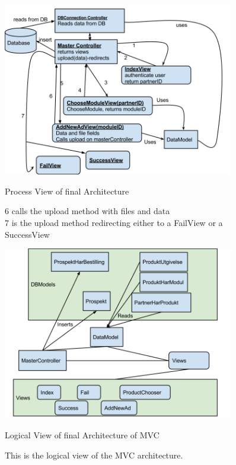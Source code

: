 \begin{center}
\begin{figure}[H]
\centering
\includegraphics[width=0.9\textwidth]{images/architecture_final01.png}
\caption{Process View of final Architecture}
\caption*{6 calls the upload method with files and data\\
7 is the upload method redirecting either to a FailView or a SuccessView}
\label{fig:process_view}
\end{figure}
\end{center}

\begin{center}
\begin{figure}[H]
\centering
\includegraphics[width=0.9\textwidth]{images/architecture_final02.png}
\caption{Logical View of final Architecture of MVC}
\caption*{This is the logical view of the MVC architecture.}
\label{fig:logical_view1}
\end{figure}
\end{center}


